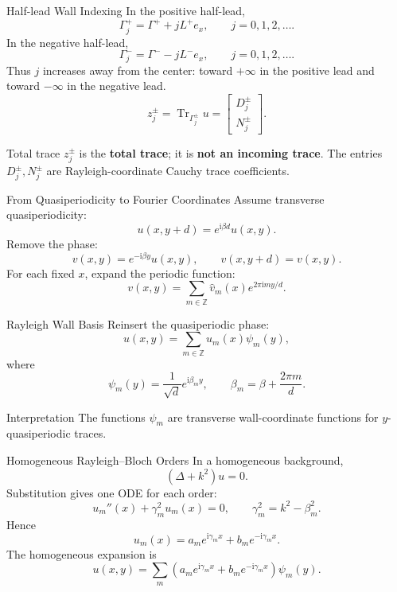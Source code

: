 \documentclass[aspectratio=169]{beamer}
\newcommand{\ii}{\mathrm{i}}
\newcommand{\tr}{\operatorname{Tr}}
\begin{document}
\begin{frame}{Half-lead Wall Indexing}
  In the positive half-lead,
  \[
    \Gamma_j^+=\Gamma^+ + jL^+e_x,
    \qquad j=0,1,2,\ldots.
  \]
  In the negative half-lead,
  \[
    \Gamma_j^-=\Gamma^- - jL^-e_x,
    \qquad j=0,1,2,\ldots.
  \]
  Thus \(j\) increases away from the center: toward \(+\infty\) in the
  positive lead and toward \(-\infty\) in the negative lead.
  \[
    z_j^\pm=\tr_{\Gamma_j^\pm}u
    =
    \begin{bmatrix}D_j^\pm\\N_j^\pm\end{bmatrix}.
  \]
  \begin{block}{Total trace}
    \(z_j^\pm\) is the \textbf{total trace}; it is \textbf{not an incoming trace}.
    The entries \(D_j^\pm,N_j^\pm\) are Rayleigh-coordinate Cauchy trace
    coefficients.
  \end{block}
\end{frame}


\begin{frame}{From Quasiperiodicity to Fourier Coordinates}
  Assume transverse quasiperiodicity:
  \[
    u(x,y+d)=e^{\ii\beta d}u(x,y).
  \]
  Remove the phase:
  \[
    v(x,y)=e^{-\ii\beta y}u(x,y),
    \qquad
    v(x,y+d)=v(x,y).
  \]
  For each fixed \(x\), expand the periodic function:
  \[
    v(x,y)
    =
    \sum_{m\in\mathbb Z}
    \widehat v_m(x)e^{2\pi\ii my/d}.
  \]
\end{frame}

\begin{frame}{Rayleigh Wall Basis}
  Reinsert the quasiperiodic phase:
  \[
    u(x,y)
    =
    \sum_{m\in\mathbb Z}u_m(x)\psi_m(y),
  \]
  where
  \[
    \psi_m(y)=\frac{1}{\sqrt d}e^{\ii\beta_m y},
    \qquad
    \beta_m=\beta+\frac{2\pi m}{d}.
  \]
  \begin{block}{Interpretation}
    The functions \(\psi_m\) are transverse wall-coordinate functions for
    \(y\)-quasiperiodic traces.
  \end{block}
\end{frame}

\begin{frame}{Homogeneous Rayleigh--Bloch Orders}
  In a homogeneous background,
  \[
    (\Delta+k^2)u=0.
  \]
  Substitution gives one ODE for each order:
  \[
    u_m''(x)+\gamma_m^2u_m(x)=0,
    \qquad
    \gamma_m^2=k^2-\beta_m^2.
  \]
  Hence
  \[
    u_m(x)=a_m e^{\ii\gamma_m x}+b_m e^{-\ii\gamma_m x}.
  \]
  The homogeneous expansion is
  \[
    u(x,y)=
    \sum_m
    \left(
      a_m e^{\ii\gamma_m x}
      +
      b_m e^{-\ii\gamma_m x}
    \right)\psi_m(y).
  \]
\end{frame}
\end{document}
